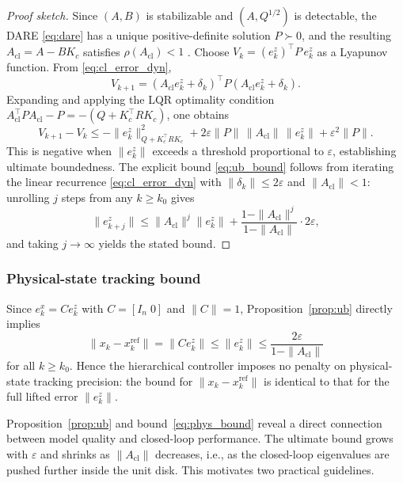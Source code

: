 \documentclass[journal]{IEEEtran}
\begin{document}
\begin{proof}[Proof sketch]
Since $(A,B)$ is stabilizable and $(A,Q^{1/2})$ is detectable, the DARE \eqref{eq:dare} has a unique positive-definite solution $P \succ 0$, and the resulting $A_{\mathrm{cl}} = A - BK_c$ satisfies $\rho(A_{\mathrm{cl}}) < 1$ \cite{korda2018linear}. Choose $V_k = (e_k^z)^\top P\, e_k^z$ as a Lyapunov function. From \eqref{eq:cl_error_dyn},
\begin{equation}
    V_{k+1} = (A_{\mathrm{cl}} e_k^z + \delta_k)^\top P (A_{\mathrm{cl}} e_k^z + \delta_k).
\end{equation}
Expanding and applying the LQR optimality condition $A_{\mathrm{cl}}^\top P A_{\mathrm{cl}} - P = -(Q + K_c^\top R K_c)$, one obtains
\begin{equation}
    V_{k+1} - V_k \leq -\|e_k^z\|_{Q+K_c^\top R K_c}^2 + 2\varepsilon \|P\|\,\|A_{\mathrm{cl}}\|\,\|e_k^z\| + \varepsilon^2 \|P\|.
\end{equation}
This is negative when $\|e_k^z\|$ exceeds a threshold proportional to $\varepsilon$, establishing ultimate boundedness. The explicit bound \eqref{eq:ub_bound} follows from iterating the linear recurrence \eqref{eq:cl_error_dyn} with $\|\delta_k\| \leq 2\varepsilon$ and $\|A_{\mathrm{cl}}\| < 1$: unrolling $j$ steps from any $k \geq k_0$ gives
\begin{equation}
    \|e_{k+j}^z\| \leq \|A_{\mathrm{cl}}\|^j \|e_k^z\| + \frac{1 - \|A_{\mathrm{cl}}\|^j}{1 - \|A_{\mathrm{cl}}\|}\cdot 2\varepsilon,
\end{equation}
and taking $j\to\infty$ yields the stated bound.
\end{proof}

\subsubsection*{Physical-state tracking bound}

Since $e_k^x = Ce_k^z$ with $C=[I_n\;0]$ and $\|C\|=1$, Proposition~\ref{prop:ub} directly implies
\begin{equation}
    \|x_k - x_k^{\mathrm{ref}}\| = \|C e_k^z\| \leq \|e_k^z\| \leq \frac{2\varepsilon}{1 - \|A_{\mathrm{cl}}\|}
    \label{eq:phys_bound}
\end{equation}
for all $k \geq k_0$. Hence the hierarchical controller imposes no penalty on physical-state tracking precision: the bound for $\|x_k - x_k^{\mathrm{ref}}\|$ is identical to that for the full lifted error $\|e_k^z\|$.

Proposition~\ref{prop:ub} and bound~\eqref{eq:phys_bound} reveal a direct connection between model quality and closed-loop performance. The ultimate bound grows with $\varepsilon$ and shrinks as $\|A_{\mathrm{cl}}\|$ decreases, i.e., as the closed-loop eigenvalues are pushed further inside the unit disk. This motivates two practical guidelines.
\end{document}
